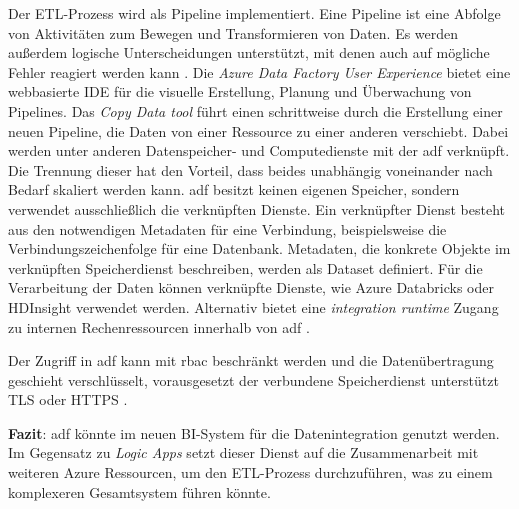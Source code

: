 Der ETL-Prozess wird als Pipeline implementiert. Eine Pipeline ist eine Abfolge von Aktivitäten zum Bewegen und Transformieren von Daten. Es werden außerdem logische Unterscheidungen unterstützt, mit denen auch auf mögliche Fehler reagiert werden kann \cite{msdoc_21_adf_errorMessage}. Die \textit{Azure Data Factory User Experience} bietet eine webbasierte IDE für die visuelle Erstellung, Planung und Überwachung von Pipelines. Das \textit{Copy Data tool} führt einen schrittweise durch die Erstellung einer neuen Pipeline, die Daten von einer Ressource zu einer anderen verschiebt. Dabei werden unter anderen Datenspeicher- und Computedienste mit der \ac{adf} verknüpft. Die Trennung dieser hat den Vorteil, dass beides unabhängig voneinander nach Bedarf skaliert werden kann. \ac{adf} besitzt keinen eigenen Speicher, sondern verwendet ausschließlich die verknüpften Dienste. Ein verknüpfter Dienst besteht aus den notwendigen Metadaten für eine Verbindung, beispielsweise die Verbindungszeichenfolge für eine Datenbank. Metadaten, die konkrete Objekte im verknüpften Speicherdienst beschreiben, werden als Dataset definiert. Für die Verarbeitung der Daten können verknüpfte Dienste, wie Azure Databricks oder HDInsight verwendet werden. Alternativ bietet eine \textit{integration runtime} Zugang zu internen Rechenressourcen innerhalb von \ac{adf} \cite{swinbank_your_2021}.

Der Zugriff in \ac{adf} kann mit \ac{rbac} beschränkt werden \cite{msdoc_21_adf_security} und die Datenübertragung geschieht verschlüsselt, vorausgesetzt der verbundene Speicherdienst unterstützt TLS oder HTTPS \cite{baldwin_azure_adf_2021}.

\textbf{Fazit}: \ac{adf} könnte im neuen BI-System für die Datenintegration genutzt werden. Im Gegensatz zu \textit{Logic Apps} setzt dieser Dienst auf die Zusammenarbeit mit weiteren Azure Ressourcen, um den ETL-Prozess durchzuführen, was zu einem komplexeren Gesamtsystem führen könnte.



